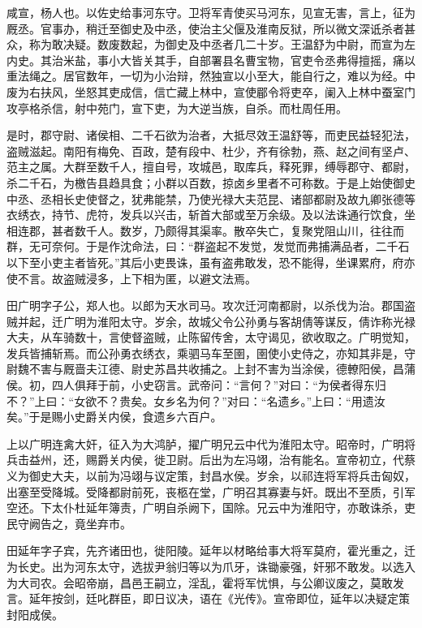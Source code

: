 \documentclass[]{article}
\begin{document}
咸宣，杨人也。以佐史给事河东守。卫将军青使买马河东，见宣无害，言上，征为厩丞。官事办，稍迁至御史及中丞，使治主父偃及淮南反狱，所以微文深诋杀者甚众，称为敢决疑。数废数起，为御史及中丞者几二十岁。王温舒为中尉，而宣为左内史。其治米盐，事小大皆关其手，自部署县名曹宝物，官吏令丞弗得擅摇，痛以重法绳之。居官数年，一切为小治辩，然独宣以小至大，能自行之，难以为经。中废为右扶风，坐怒其吏成信，信亡藏上林中，宣使郿令将吏卒，阑入上林中蚕室门攻亭格杀信，射中苑门，宣下吏，为大逆当族，自杀。而杜周任用。

是时，郡守尉、诸侯相、二千石欲为治者，大抵尽效王温舒等，而吏民益轻犯法，盗贼滋起。南阳有梅免、百政，楚有段中、杜少，齐有徐勃，燕、赵之间有坚卢、范主之属。大群至数千人，擅自号，攻城邑，取库兵，释死罪，缚辱郡守、都尉，杀二千石，为檄告县趋具食；小群以百数，掠卤乡里者不可称数。于是上始使御史中丞、丞相长史使督之，犹弗能禁，乃使光禄大夫范昆、诸部都尉及故九卿张德等衣绣衣，持节、虎符，发兵以兴击，斩首大部或至万余级。及以法诛通行饮食，坐相连郡，甚者数千人。数岁，乃颇得其渠率。散卒失亡，复聚党阻山川，往往而群，无可奈何。于是作沈命法，曰：``群盗起不发觉，发觉而弗捕满品者，二千石以下至小吏主者皆死。''其后小吏畏诛，虽有盗弗敢发，恐不能得，坐课累府，府亦使不言。故盗贼浸多，上下相为匿，以避文法焉。

田广明字子公，郑人也。以郎为天水司马。攻次迁河南都尉，以杀伐为治。郡国盗贼并起，迁广明为淮阳太守。岁余，故城父令公孙勇与客胡倩等谋反，倩诈称光禄大夫，从车骑数十，言使督盗贼，止陈留传舍，太守谒见，欲收取之。广明觉知，发兵皆捕斩焉。而公孙勇衣绣衣，乘驷马车至圉，圉使小史侍之，亦知其非是，守尉魏不害与厩啬夫江德、尉史苏昌共收捕之。上封不害为当涂侯，德轑阳侯，昌蒲侯。初，四人俱拜于前，小史窃言。武帝问：``言何？''对曰：``为侯者得东归不？''上曰：``女欲不？贵矣。女乡名为何？''对曰：``名遗乡。''上曰：``用遗汝矣。''于是赐小史爵关内侯，食遗乡六百户。

上以广明连禽大奸，征入为大鸿胪，擢广明兄云中代为淮阳太守。昭帝时，广明将兵击益州，还，赐爵关内侯，徙卫尉。后出为左冯翊，治有能名。宣帝初立，代蔡义为御史大夫，以前为冯翊与议定策，封昌水侯。岁余，以祁连将军将兵击匈奴，出塞至受降城。受降都尉前死，丧柩在堂，广明召其寡妻与奸。既出不至质，引军空还。下太仆杜延年簿责，广明自杀阙下，国除。兄云中为淮阳守，亦敢诛杀，吏民守阙告之，竟坐弃市。

田延年字子宾，先齐诸田也，徙阳陵。延年以材略给事大将军莫府，霍光重之，迁为长史。出为河东太守，选拔尹翁归等以为爪牙，诛锄豪强，奸邪不敢发。以选入为大司农。会昭帝崩，昌邑王嗣立，淫乱，霍将军忧惧，与公卿议废之，莫敢发言。延年按剑，廷叱群臣，即日议决，语在《光传》。宣帝即位，延年以决疑定策封阳成侯。
\end{document}
